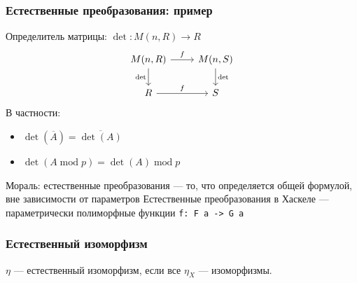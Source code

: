 \documentclass{beamer}
\begin{document}
\begin{frame}[fragile]
\frametitle{Естественные преобразования: пример}
Определитель матрицы: \begin{math}\det:M(n,R) \rightarrow R\end{math}
\pause
\begin{equation}
\begin{tikzcd}
M(n,R) \arrow{r}{f} \arrow{d}[swap]{\det} & M(n,S) \arrow{d}{\det} \\
R \arrow{r}{f} & S
\end{tikzcd}
\end{equation}
\pause
В частности:
\begin{itemize}
\item \begin{math}\det(\overline A) = \overline{\det(A)}\end{math}
\item \begin{math}\det(A \operatorname{mod} p) = \det(A) \operatorname{mod} p\end{math}
\end{itemize}
\pause
Мораль: естественные преобразования --- то, что определяется общей формулой, вне зависимости от параметров
\newline
\pause
Естественные преобразования в Хаскеле --- параметрически полиморфные функции \texttt{f: F a -> G a}
\end{frame}

\begin{frame}
\frametitle{Естественный изоморфизм}
\begin{math}\eta\end{math} --- естественный изоморфизм, если все \begin{math}\eta_X\end{math} --- изоморфизмы.
\end{frame}
\end{document}
